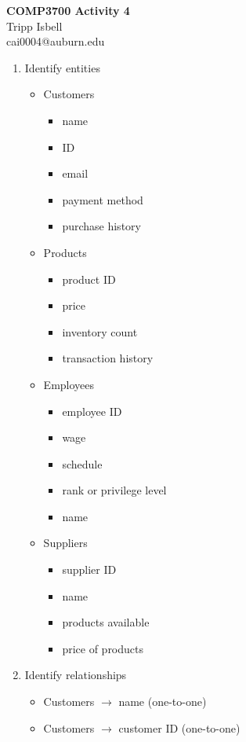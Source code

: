 \documentclass{letter}
\begin{document}
\begin{center}
\textbf{COMP3700 Activity 4}\\
Tripp Isbell\\
cai0004@auburn.edu
\end{center}

\begin{enumerate}
	\item Identify entities
	\begin{itemize}
		\item Customers
		\begin{itemize}
			\item name
			\item ID
			\item email
			\item payment method
			\item purchase history
		\end{itemize}
		\item Products
		\begin{itemize}
			\item product ID
			\item price
			\item inventory count
			\item transaction history
		\end{itemize}
		\item Employees
		\begin{itemize}
			\item employee ID
			\item wage
			\item schedule
			\item rank or privilege level
			\item name
		\end{itemize}
		\item Suppliers
		\begin{itemize}
			\item supplier ID
			\item name
			\item products available
			\item price of products
		\end{itemize}
	\end{itemize}
\newpage
	\item Identify relationships
	\begin{itemize}
		\item Customers $\longrightarrow$ name (one-to-one)
		\item Customers $\longrightarrow$ customer ID (one-to-one)

\end{itemize}
\end{enumerate}
\end{document}

